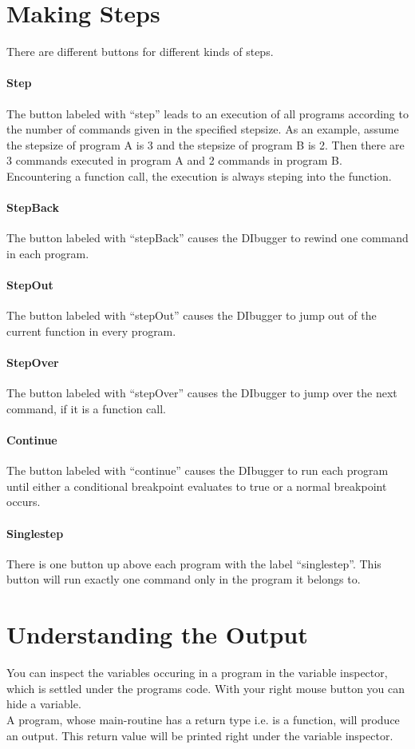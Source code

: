 \documentclass[parskip=full]{memoir}
\begin{document}
\section{Making Steps}
There are different buttons for different kinds of steps.
\paragraph{Step}
The button labeled with \enquote{step} leads to an execution of all programs according to the number of commands given in the specified stepsize. As an example, assume the stepsize of program A is 3 and the stepsize of program B is 2. Then there are 3 commands executed in program A and 2 commands in program B. Encountering a function call, the execution is always steping into the function.
\paragraph{StepBack}
The button labeled with \enquote{stepBack} causes the DIbugger to rewind one command in each program.
\paragraph{StepOut}
The button labeled with \enquote{stepOut} causes the DIbugger to jump out of the current function in every program.
\paragraph{StepOver}
The button labeled with \enquote{stepOver} causes the DIbugger to jump over the next command, if it is a function call.
\paragraph{Continue}
The button labeled with \enquote{continue} causes the DIbugger to run each program until either a conditional breakpoint evaluates to true or a normal breakpoint occurs.
\paragraph{Singlestep}
There is one button up above each program with the label \enquote{singlestep}. This button will run exactly one command only in the program it belongs to.
\section{Understanding the Output}
You can inspect the variables occuring in a program in the variable inspector, which is settled under the programs code. With your right mouse button you can hide a variable.\\
A program, whose main-routine has a return type i.e. is a function, will produce an output. 
This return value will be printed right under the variable inspector.
\end{document}
